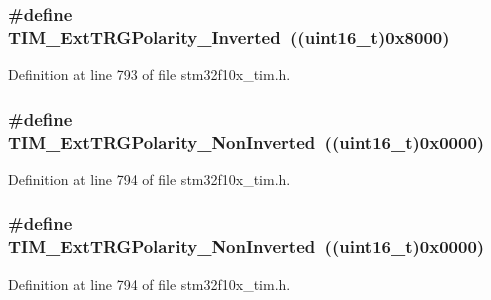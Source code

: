 \subsubsection[{\texorpdfstring{T\+I\+M\+\_\+\+Ext\+T\+R\+G\+Polarity\+\_\+\+Inverted}{TIM_ExtTRGPolarity_Inverted}}]{\setlength{\rightskip}{0pt plus 5cm}\#define T\+I\+M\+\_\+\+Ext\+T\+R\+G\+Polarity\+\_\+\+Inverted~(({\bf uint16\+\_\+t})0x8000)}\hypertarget{group___t_i_m___external___trigger___polarity_ga96f3959a02c0491ab8d65cfa384ce7e3}{}\label{group___t_i_m___external___trigger___polarity_ga96f3959a02c0491ab8d65cfa384ce7e3}


Definition at line 793 of file stm32f10x\+\_\+tim.\+h.

\subsubsection[{\texorpdfstring{T\+I\+M\+\_\+\+Ext\+T\+R\+G\+Polarity\+\_\+\+Non\+Inverted}{TIM_ExtTRGPolarity_NonInverted}}]{\setlength{\rightskip}{0pt plus 5cm}\#define T\+I\+M\+\_\+\+Ext\+T\+R\+G\+Polarity\+\_\+\+Non\+Inverted~(({\bf uint16\+\_\+t})0x0000)}\hypertarget{group___t_i_m___external___trigger___polarity_ga63fe7c58c491d2a812d5621b71c2d0c5}{}\label{group___t_i_m___external___trigger___polarity_ga63fe7c58c491d2a812d5621b71c2d0c5}


Definition at line 794 of file stm32f10x\+\_\+tim.\+h.

\subsubsection[{\texorpdfstring{T\+I\+M\+\_\+\+Ext\+T\+R\+G\+Polarity\+\_\+\+Non\+Inverted}{TIM_ExtTRGPolarity_NonInverted}}]{\setlength{\rightskip}{0pt plus 5cm}\#define T\+I\+M\+\_\+\+Ext\+T\+R\+G\+Polarity\+\_\+\+Non\+Inverted~(({\bf uint16\+\_\+t})0x0000)}\hypertarget{group___t_i_m___external___trigger___polarity_ga63fe7c58c491d2a812d5621b71c2d0c5}{}\label{group___t_i_m___external___trigger___polarity_ga63fe7c58c491d2a812d5621b71c2d0c5}


Definition at line 794 of file stm32f10x\+\_\+tim.\+h.

